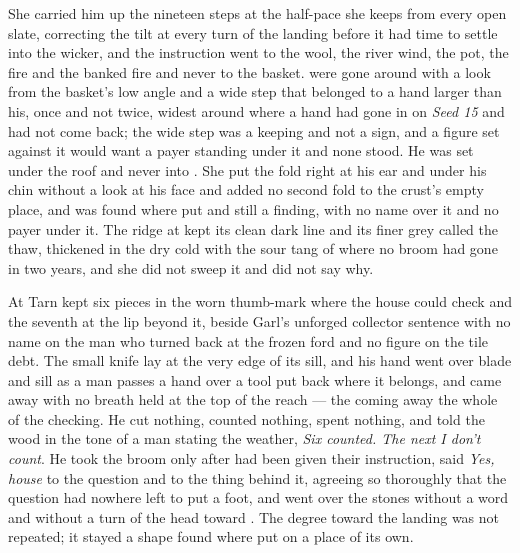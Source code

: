 She carried him up the nineteen steps at the half-pace she keeps from every open slate, correcting the tilt at every turn of the landing before it had time to settle into the wicker, and the instruction went to the wool, the river wind, the pot, the fire and the banked fire and never to the basket.  were gone around with a look from the basket's low angle and a wide step that belonged to a hand larger than his, once and not twice, widest around  where a hand had gone in on \emph{Seed 15} and had not come back; the wide step was a keeping and not a sign, and a figure set against it would want a payer standing under it and none stood. He was set under the roof and never into . She put the fold right at his ear and under his chin without a look at his face and added no second fold to the crust's empty place, and  was found where put and still a finding, with no name over it and no payer under it. The ridge at  kept its clean dark line and its finer grey called the thaw, thickened in the dry cold with the sour tang of  where no broom had gone in two years, and she did not sweep it and did not say why.

At  Tarn kept six pieces in the worn thumb-mark where the house could check and the seventh at the lip beyond it, beside Garl's unforged collector sentence with no name on the man who turned back at the frozen ford and no figure on the tile debt. The small knife lay at the very edge of its sill, and his hand went over blade and sill as a man passes a hand over a tool put back where it belongs, and came away with no breath held at the top of the reach --- the coming away the whole of the checking. He cut nothing, counted nothing, spent nothing, and told the wood in the tone of a man stating the weather, \emph{Six counted. The next I don't count}. He took the broom only after  had been given their instruction, said \emph{Yes, house} to the question and to the thing behind it, agreeing so thoroughly that the question had nowhere left to put a foot, and went over the stones without a word and without a turn of the head toward . The degree toward the landing was not repeated; it stayed a shape found where put on a place of its own.

